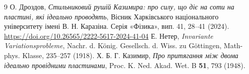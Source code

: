\documentclass[10pt]{article}
\begin{document}
\begin{thebibliography}{9}
О. Дроздов, \textit{Стильниковий рушій Казимира: про силу, що діє на соти на пластині, які ідеально проводять}, Вісник Харківського національного університету імені В. Н. Каразіна. Серія «Фізика», вип. 41, 28--41 (2024). \url{https://doi.org/10.26565/2222-5617-2024-41-04}
Е. Нетер, \textit{Invariante Variationsprobleme}, Nachr. d. König. Gesellsch. d. Wiss. zu Göttingen, Math-phys. Klasse, 235–257 (1918).
Х. Б. Г. Казимир, \textit{Про притягання між двома ідеально провідними пластинами}, Proc. K. Ned. Akad. Wet. B \textbf{51}, 793 (1948).
\end{thebibliography}
\end{document}
